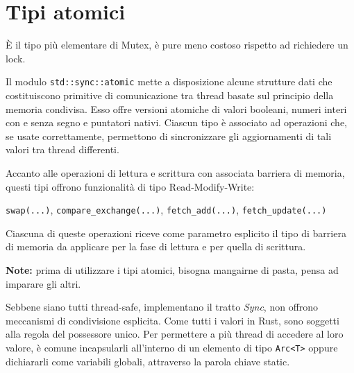 \begin{center}
  \begin{minipage}{0.45\linewidth}

  \end{minipage}%
  \hfill
  \begin{minipage}{0.45\linewidth}
    \begin{verbatim}

\end{verbatim}
  \end{minipage}
\end{center}


\section{Tipi atomici}

È il tipo più elementare di Mutex, è pure meno costoso rispetto ad richiedere un lock.

Il modulo \verb|std::sync::atomic| mette a disposizione alcune strutture dati
che costituiscono primitive di comunicazione tra thread basate sul principio
della memoria condivisa. Esso offre versioni atomiche di valori booleani, numeri
interi con e senza segno e puntatori nativi.
Ciascun tipo è associato ad operazioni che, se usate correttamente, permettono
di sincronizzare gli aggiornamenti di tali valori tra thread differenti.


Accanto alle operazioni di lettura e scrittura con associata barriera di memoria,
questi tipi offrono funzionalità di tipo Read-Modify-Write:

\begin{center}
  \verb|swap(...)|, \verb|compare_exchange(...)|, \verb|fetch_add(...)|, \verb|fetch_update(...)|
\end{center}

Ciascuna di queste operazioni riceve come parametro esplicito il tipo di barriera di memoria da
applicare per la fase di lettura e per quella di scrittura.


\begin{tcolorbox}
  \textbf{Note:} prima di utilizzare i tipi atomici, bisogna mangairne di pasta, pensa ad
  imparare gli altri.
\end{tcolorbox}


Sebbene siano tutti thread-safe, implementano il tratto \textit{Sync}, non offrono
meccanismi di condivisione esplicita. Come tutti i valori in Rust, sono
soggetti alla regola del possessore unico. Per permettere a più thread di
accedere al loro valore, è comune incapsularli all'interno di un elemento di
tipo \verb|Arc<T>| oppure dichiararli come variabili globali, attraverso la parola
chiave static.


